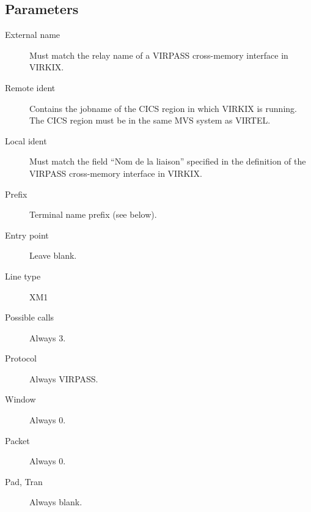 \documentclass[letterpaper,10pt,english]{sphinxmanual}
\begin{document}
\subsection{Parameters}
\label{\detokenize{connectivity_guide:index-49}}\label{\detokenize{connectivity_guide:id20}}\begin{description}
\item[{External name}] \leavevmode
Must match the relay name of a VIRPASS cross-memory interface in VIRKIX.

\item[{Remote ident}] \leavevmode
Contains the jobname of the CICS region in which VIRKIX is running.
The CICS region must be in the same MVS system as VIRTEL.

\item[{Local ident}] \leavevmode
Must match the field “Nom de la liaison” specified in the definition
of the VIRPASS cross-memory interface in VIRKIX.

\item[{Prefix}] \leavevmode
Terminal name prefix (see below).

\item[{Entry point}] \leavevmode
Leave blank.

\item[{Line type}] \leavevmode
XM1

\item[{Possible calls}] \leavevmode
Always 3.

\item[{Protocol}] \leavevmode
Always VIRPASS.

\item[{Window}] \leavevmode
Always 0.

\item[{Packet}] \leavevmode
Always 0.

\item[{Pad, Tran}] \leavevmode
Always blank.

\end{description}

\ignorespaces 
\end{document}
